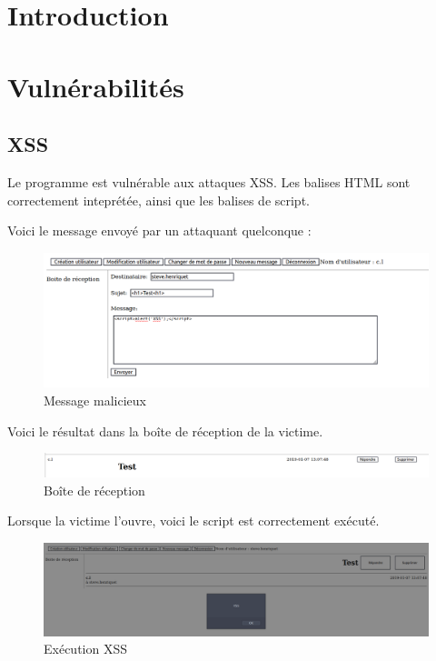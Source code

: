 \documentclass[12pt]{article}
\begin{document}


\tableofcontents

\newpage
\section{Introduction}


\section{Vulnérabilités}
\subsection{XSS}
Le programme est vulnérable aux attaques XSS. Les balises HTML sont correctement inteprétée, ainsi que les balises de script. 

Voici le message envoyé par un attaquant quelconque : 
\begin{figure}[H]
\centering
\includegraphics[width=\linewidth]{images/xssAttack.png}
\caption{Message malicieux}
\end{figure}

Voici le résultat dans la boîte de réception de la victime.
\begin{figure}[H]
\centering
\includegraphics[width=\linewidth]{images/xssRecep.png}
\caption{Boîte de réception}
\end{figure}

Lorsque la victime l'ouvre, voici le script est correctement exécuté.
\begin{figure}[H]
\centering
\includegraphics[width=\linewidth]{images/xssOpen.png}
\caption{Exécution XSS}
\end{figure}
\end{document}
